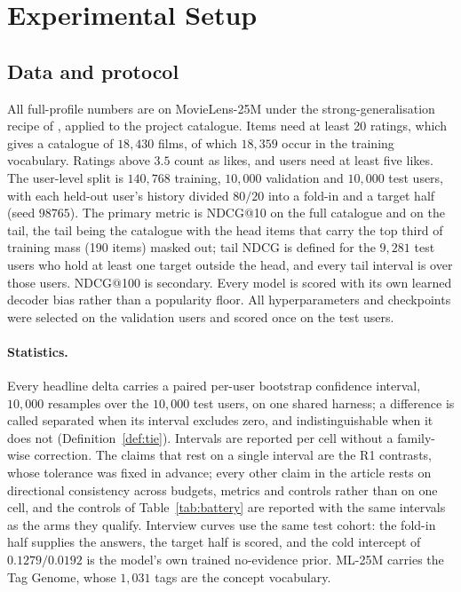 \documentclass[manuscript,screen,review]{acmart}
\begin{document}
\section{Experimental Setup}\label{sec:setup}

\subsection{Data and protocol}
All full-profile numbers are on MovieLens-25M under the strong-generalisation recipe of \citet{liang2018variational}, applied to the project catalogue. Items need at least 20 ratings, which gives a catalogue of $18{,}430$ films, of which $18{,}359$ occur in the training vocabulary. Ratings above $3.5$ count as likes, and users need at least five likes. The user-level split is $140{,}768$ training, $10{,}000$ validation and $10{,}000$ test users, with each held-out user's history divided $80/20$ into a fold-in and a target half (seed $98765$). The primary metric is NDCG@10 on the full catalogue and on the tail, the tail being the catalogue with the head items that carry the top third of training mass (190 items) masked out; tail NDCG is defined for the $9{,}281$ test users who hold at least one target outside the head, and every tail interval is over those users. NDCG@100 is secondary. Every model is scored with its own learned decoder bias rather than a popularity floor. All hyperparameters and checkpoints were selected on the validation users and scored once on the test users.

\paragraph{Statistics.} Every headline delta carries a paired per-user bootstrap confidence interval, $10{,}000$ resamples over the $10{,}000$ test users, on one shared harness; a difference is called separated when its interval excludes zero, and indistinguishable when it does not (Definition~\ref{def:tie}). Intervals are reported per cell without a family-wise correction. The claims that rest on a single interval are the R1 contrasts, whose tolerance was fixed in advance; every other claim in the article rests on directional consistency across budgets, metrics and controls rather than on one cell, and the controls of Table~\ref{tab:battery} are reported with the same intervals as the arms they qualify. Interview curves use the same test cohort: the fold-in half supplies the answers, the target half is scored, and the cold intercept of $0.1279/0.0192$ is the model's own trained no-evidence prior. ML-25M carries the Tag Genome, whose $1{,}031$ tags are the concept vocabulary.
\end{document}
